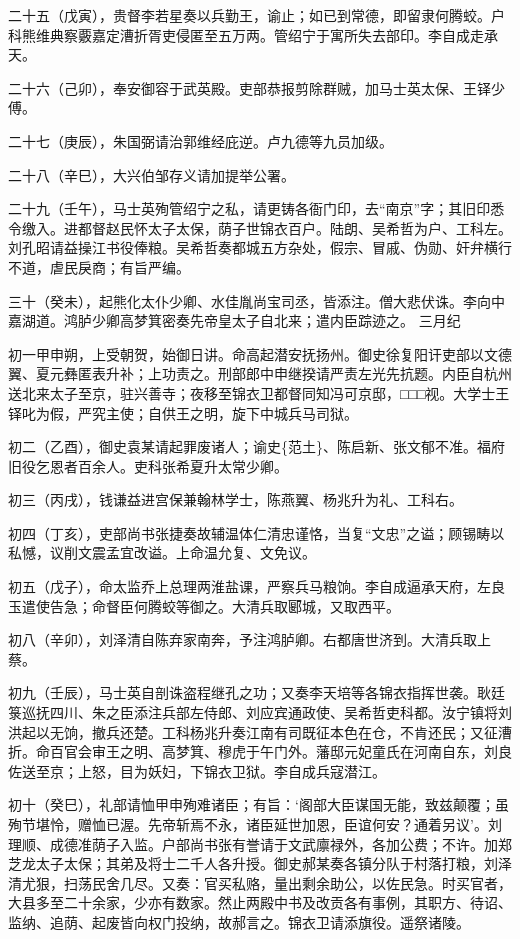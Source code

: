 \documentclass[]{article}
\begin{document}
二十五（戊寅），贵督李若星奏以兵勤王，谕止；如已到常德，即留隶何腾蛟。户科熊维典察覈嘉定漕折胥吏侵匿至五万两。管绍宁于寓所失去部印。李自成走承天。

二十六（己卯），奉安御容于武英殿。吏部恭报剪除群贼，加马士英太保、王铎少傅。

二十七（庚辰），朱国弼请治郭维经庇逆。卢九德等九员加级。

二十八（辛巳），大兴伯邹存义请加提举公署。

二十九（壬午），马士英殉管绍宁之私，请更铸各衙门印，去``南京''字；其旧印悉令缴入。进都督赵民怀太子太保，荫子世锦衣百户。陆朗、吴希哲为户、工科左。刘孔昭请益操江书役俸粮。吴希哲奏都城五方杂处，假宗、冒戚、伪勋、奸弁横行不道，虐民戾商；有旨严编。

三十（癸未），起熊化太仆少卿、水佳胤尚宝司丞，皆添注。僧大悲伏诛。李向中嘉湖道。鸿胪少卿高梦箕密奏先帝皇太子自北来；遣内臣踪迹之。
三月纪

初一甲申朔，上受朝贺，始御日讲。命高起潜安抚扬州。御史徐复阳讦吏部以文德翼、夏元彝匿表升补；上功责之。刑部郎中申继揆请严责左光先抗题。内臣自杭州送北来太子至京，驻兴善寺；夜移至锦衣卫都督同知冯可京邸，□□□视。大学士王铎叱为假，严究主使；自供王之明，旋下中城兵马司狱。

初二（乙酉），御史袁某请起罪废诸人；谕史\{范土\}、陈启新、张文郁不准。福府旧役乞恩者百余人。吏科张希夏升太常少卿。

初三（丙戌），钱谦益进宫保兼翰林学士，陈燕翼、杨兆升为礼、工科右。

初四（丁亥），吏部尚书张捷奏故辅温体仁清忠谨恪，当复``文忠''之谥；顾锡畴以私憾，议削文震孟宜改谥。上命温允复、文免议。

初五（戊子），命太监乔上总理两淮盐课，严察兵马粮饷。李自成逼承天府，左良玉遣使告急；命督臣何腾蛟等御之。大清兵取郾城，又取西平。

初八（辛卯），刘泽清自陈弃家南奔，予注鸿胪卿。右都唐世济到。大清兵取上蔡。

初九（壬辰），马士英自剖诛盗程继孔之功；又奏李天培等各锦衣指挥世袭。耿廷箓巡抚四川、朱之臣添注兵部左侍郎、刘应宾通政使、吴希哲吏科都。汝宁镇将刘洪起以无饷，撤兵还楚。工科杨兆升奏江南有司既征本色在仓，不肯还民；又征漕折。命百官会审王之明、高梦箕、穆虎于午门外。藩邸元妃童氏在河南自东，刘良佐送至京；上怒，目为妖妇，下锦衣卫狱。李自成兵寇潜江。

初十（癸巳），礼部请恤甲申殉难诸臣；有旨：`阁部大臣谋国无能，致兹颠覆；虽殉节堪怜，赠恤已渥。先帝斩焉不永，诸臣延世加恩，臣谊何安？通着另议'。刘理顺、成德准荫子入监。户部尚书张有誉请于文武廪禄外，各加公费；不许。加郑芝龙太子太保；其弟及将士二千人各升授。御史郝某奏各镇分队于村落打粮，刘泽清尤狠，扫荡民舍几尽。又奏：官买私赂，量出剩余助公，以佐民急。时买官者，大县多至二十余家，少亦有数家。然止两殿中书及改贡各有事例，其职方、待诏、监纳、追荫、起废皆向权门投纳，故郝言之。锦衣卫请添旗役。遥祭诸陵。
\end{document}

